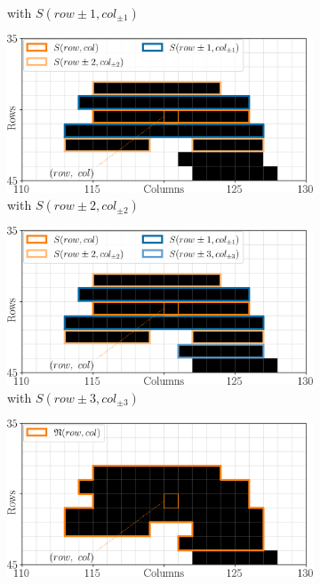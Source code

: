 \begin{figure}
\begin{subfigure}[t]{0.5\linewidth}
        \caption{with $S(row\pm1, col_{\pm1})$}
        \label{fig:low_confidence_segments_3}
    \end{subfigure}
    \begin{subfigure}[t]{0.5\linewidth}
        \flushright
        \includegraphics[width=\linewidth]{Images/Chap_5/low_confidence_segments_4.png}
        \caption{with $S(row\pm2, col_{\pm2})$}
        \label{fig:low_confidence_segments_4}
    \end{subfigure}\vspace*{0.3cm}
    \begin{subfigure}[t]{0.5\linewidth}
        \flushleft
        \includegraphics[width=\linewidth]{Images/Chap_5/low_confidence_segments_5.png}
        \caption{with $S(row\pm3, col_{\pm3})$}
        \label{fig:low_confidence_segments_5}
    \end{subfigure}
    \begin{subfigure}[t]{0.5\linewidth}
        \flushright
        \includegraphics[width=\linewidth]{Images/Chap_5/low_confidence_segments_6.png}

\end{subfigure}
\end{figure}
